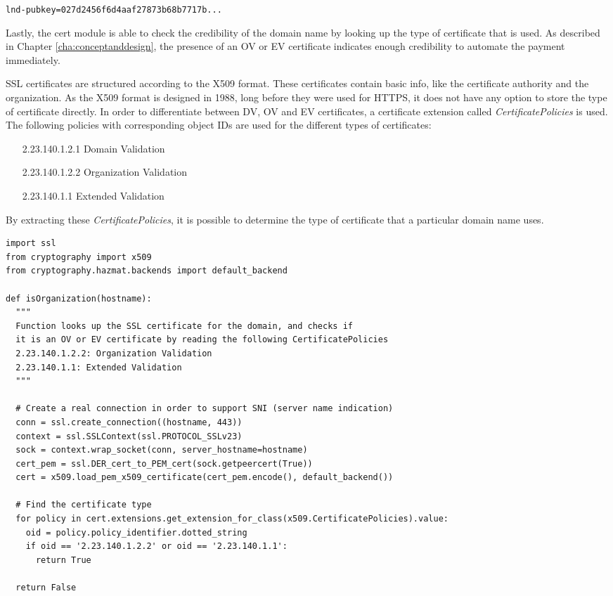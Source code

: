 \texttt{lnd-pubkey=027d2456f6d4aaf27873b68b7717b...}

Lastly, the cert module is able to check the credibility of the domain name by looking up the type of certificate that is used. As described in Chapter \ref{cha:conceptanddesign}, the presence of an OV or EV certificate indicates enough credibility to automate the payment immediately. 

SSL certificates are structured according to the X509 format. These certificates contain basic info, like the certificate authority and the organization. As the X509 format is designed in 1988, long before they were used for HTTPS, it does not have any option to store the type of certificate directly. In order to differentiate between DV, OV and EV certificates, a certificate extension called \textit{CertificatePolicies} is used. The following policies with corresponding object IDs are used for the different types of certificates:

\begin{enumerate}[leftmargin=8em]
  \item[2.23.140.1.2.1] Domain Validation
  \item[2.23.140.1.2.2] Organization Validation
  \item[2.23.140.1.1] Extended Validation
\end{enumerate}

By extracting these \textit{CertificatePolicies}, it is possible to determine the type of certificate that a particular domain name uses. 


\lstset{language=Python}
\lstset{frame=lines}
\lstset{basicstyle=\footnotesize}
\begin{lstlisting}
import ssl
from cryptography import x509
from cryptography.hazmat.backends import default_backend

def isOrganization(hostname):
  """
  Function looks up the SSL certificate for the domain, and checks if 
  it is an OV or EV certificate by reading the following CertificatePolicies
  2.23.140.1.2.2: Organization Validation
  2.23.140.1.1: Extended Validation 
  """

  # Create a real connection in order to support SNI (server name indication)
  conn = ssl.create_connection((hostname, 443))
  context = ssl.SSLContext(ssl.PROTOCOL_SSLv23)
  sock = context.wrap_socket(conn, server_hostname=hostname)
  cert_pem = ssl.DER_cert_to_PEM_cert(sock.getpeercert(True))
  cert = x509.load_pem_x509_certificate(cert_pem.encode(), default_backend())
  
  # Find the certificate type
  for policy in cert.extensions.get_extension_for_class(x509.CertificatePolicies).value:
    oid = policy.policy_identifier.dotted_string
    if oid == '2.23.140.1.2.2' or oid == '2.23.140.1.1':
      return True

  return False
\end{lstlisting}

